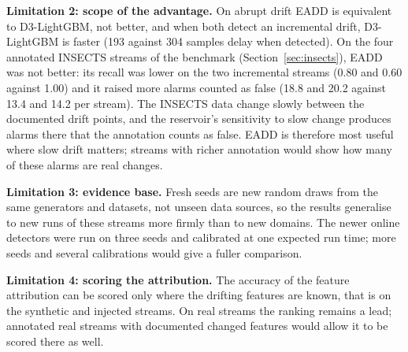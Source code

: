 \textbf{Limitation 2: scope of the advantage.} On abrupt drift EADD is equivalent to D3-LightGBM, not better, and when both detect an incremental drift, D3-LightGBM is faster (193 against 304 samples delay when detected). On the four annotated INSECTS streams of the benchmark (Section~\ref{sec:insects}), EADD was not better: its recall was lower on the two incremental streams (0.80 and 0.60 against 1.00) and it raised more alarms counted as false (18.8 and 20.2 against 13.4 and 14.2 per stream). The INSECTS data change slowly between the documented drift points, and the reservoir's sensitivity to slow change produces alarms there that the annotation counts as false. EADD is therefore most useful where slow drift matters; streams with richer annotation would show how many of these alarms are real changes.

\textbf{Limitation 3: evidence base.} Fresh seeds are new random draws from the same generators and datasets, not unseen data sources, so the results generalise to new runs of these streams more firmly than to new domains. The newer online detectors were run on three seeds and calibrated at one expected run time; more seeds and several calibrations would give a fuller comparison.

\textbf{Limitation 4: scoring the attribution.} The accuracy of the feature attribution can be scored only where the drifting features are known, that is on the synthetic and injected streams. On real streams the ranking remains a lead; annotated real streams with documented changed features would allow it to be scored there as well.
